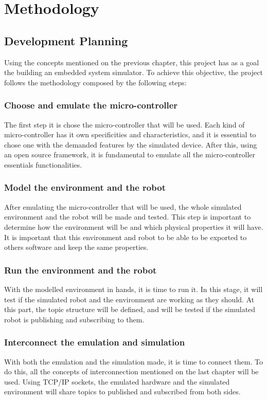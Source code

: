 \documentclass[../monografia.tex]{subfiles}
\begin{document}
\part{Methodology}

\chapter{Development Planning}

Using the concepts mentioned on the previous chapter, this project has as a goal the building an embedded system simulator.
To achieve this objective, the project follows the methodology composed by the following steps:

\section{Choose and emulate the micro-controller}
The first step it is chose the micro-controller that will be used. Each kind of micro-controller has it own specificities and characteristics, and it is essential to chose one with the demanded features by the simulated device. After this, using an open source framework, it is fundamental to emulate all the micro-controller essentials functionalities.

\section{Model the environment and the robot}
After emulating the micro-controller that will be used, the whole simulated environment and the robot will be made and tested. This step is important to determine how the environment will be and which physical properties it will have. It is important that this environment and robot to be able to be exported to others software and keep the same properties. 

\section{Run the environment and the robot}
With the modelled environment in hands, it is time to run it. In this stage, it will test if the simulated robot and the environment are working as they should. At this part, the topic structure will be defined, and will be tested if the simulated robot is publishing and subscribing to them.

\section{Interconnect the emulation and simulation}
With both the emulation and the simulation made, it is time to connect them. To do this, all the concepts of interconnection mentioned on the last chapter will be used. Using TCP/IP sockets, the emulated hardware and the simulated environment will share topics to published and subscribed from both sides. 
\end{document}

